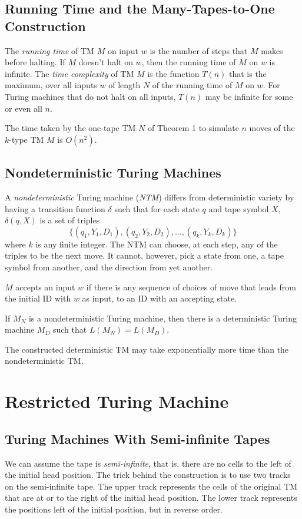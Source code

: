 \documentclass[]{article}
\begin{document}
\subsection*{Running Time and the Many-Tapes-to-One Construction}
The \emph{running time} of TM $M$ on input $w$ is the number of steps that $M$
makes before halting. If $M$ doesn't halt on $w$, then the running time of $M$
on $w$ is infinite. The \emph{time complexity} of TM $M$ is the function $T(n)$
that is the maximum, over all inputs $w$ of length $N$ of the running time of
$M$ on $w$. For Turing machines that do not halt on all inputs, $T(n)$ may be
infinite for some or even all $n$.

\begin{thm}
The time taken by the one-tape TM $N$ of Theorem 1 to simulate $n$ moves of the
$k$-type TM $M$ is $O(n^2)$.
\end{thm}

\subsection*{Nondeterministic Turing Machines}
A \emph{nondeterministic} Turing machine (\emph{NTM}) differs from deterministic
variety by having a transition function $\delta$ such that for each state $q$
and tape symbol $X$, $\delta(q,X)$ is a set of triples
\[ \{(q_1,Y_1,D_1), (q_2,Y_2,D_2),\ldots,(q_k,Y_k,D_k)\} \]
where $k$ is any finite integer. The NTM can choose, at each step, any of the
triples to be the next move. It cannot, however, pick a state from one, a tape
symbol from another, and the direction from yet another.

$M$ accepts an input $w$ if there is any sequence of choices of move that leads
from the initial ID with $w$ as input, to an ID with an accepting state.

\begin{thm}
If $M_N$ is a nondeterministic Turing machine, then there is a deterministic
Turing machine $M_D$ such that $L(M_N) = L(M_D)$.
\end{thm}

The constructed deterministic TM may take exponentially more time than the
nondeterministic TM.

\section*{Restricted Turing Machine}
\subsection*{Turing Machines With Semi-infinite Tapes}
We can assume the tape is \emph{semi-infinite}, that is, there are no cells to
the left of the initial head position. The trick behind the construction is to
use two tracks on the semi-infinite tape. The upper track represents the cells
of the original TM that are at or to the right of the initial head position. The
lower track represents the positions left of the initial position, but in
reverse order.
\end{document}
